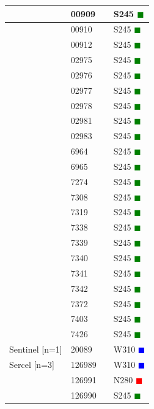 \documentclass{article}
\begin{document}
\begin{tabularx}{\linewidth}{|X|l|l|X|}
 & 00909 &  & S245 \textcolor{green}{$\blacksquare$} \\ \hline
 & 00910 &  & S245 \textcolor{green}{$\blacksquare$} \\ \hline
 & 00912 &  & S245 \textcolor{green}{$\blacksquare$} \\ \hline
 & 02975 &  & S245 \textcolor{green}{$\blacksquare$} \\ \hline
 & 02976 &  & S245 \textcolor{green}{$\blacksquare$} \\ \hline
 & 02977 &  & S245 \textcolor{green}{$\blacksquare$} \\ \hline
 & 02978 &  & S245 \textcolor{green}{$\blacksquare$} \\ \hline
 & 02981 &  & S245 \textcolor{green}{$\blacksquare$} \\ \hline
 & 02983 &  & S245 \textcolor{green}{$\blacksquare$} \\ \hline
 & 6964 &  & S245 \textcolor{green}{$\blacksquare$} \\ \hline
 & 6965 &  & S245 \textcolor{green}{$\blacksquare$} \\ \hline
 & 7274 &  & S245 \textcolor{green}{$\blacksquare$} \\ \hline
 & 7308 &  & S245 \textcolor{green}{$\blacksquare$} \\ \hline
 & 7319 &  & S245 \textcolor{green}{$\blacksquare$} \\ \hline
 & 7338 &  & S245 \textcolor{green}{$\blacksquare$} \\ \hline
 & 7339 &  & S245 \textcolor{green}{$\blacksquare$} \\ \hline
 & 7340 &  & S245 \textcolor{green}{$\blacksquare$} \\ \hline
 & 7341 &  & S245 \textcolor{green}{$\blacksquare$} \\ \hline
 & 7342 &  & S245 \textcolor{green}{$\blacksquare$} \\ \hline
 & 7372 &  & S245 \textcolor{green}{$\blacksquare$} \\ \hline
 & 7403 &  & S245 \textcolor{green}{$\blacksquare$} \\ \hline
 & 7426 &  & S245 \textcolor{green}{$\blacksquare$} \\ \hline
Sentinel [n=1] & 20089 &  & W310 \textcolor{blue}{$\blacksquare$} \\ \hline
Sercel [n=3] & 126989 &  & W310 \textcolor{blue}{$\blacksquare$} \\ \hline
 & 126991 &  & N280 \textcolor{red}{$\blacksquare$} \\ \hline
 & 126990 &  & S245 \textcolor{green}{$\blacksquare$} \\ \hline

\end{tabularx}
\end{document}
